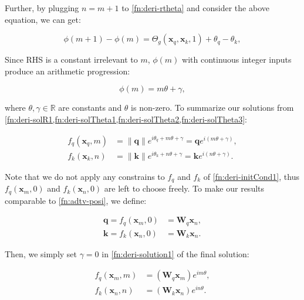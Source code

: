 Further, by plugging  $n = m + 1$ to \ref{fn:deri-rtheta} and consider the above equation, we can get:

\begin{equation}
	\phi(m + 1) - \phi(m) = \Theta_g({\boldsymbol x}_q, {\boldsymbol x}_k, 1) + \theta_q - \theta_k,
	\label{fn:deri-solTheta2}
\end{equation}

Since RHS is a constant irrelevant to $m$, $\phi(m)$ with continuous integer inputs produce an arithmetic progression:

\begin{equation}
	\phi(m) = m\theta + \gamma,
	\label{fn:deri-solTheta3}
\end{equation}

where $\theta,\gamma \in \mathbb{R}$ are constants and $\theta$ is non-zero. To summarize our solutions from \ref{fn:deri-solR1,fn:deri-solTheta1,fn:deri-solTheta2,fn:deri-solTheta3}:

\begin{equation}
	\begin{aligned}
		f_q({\boldsymbol x}_q, m) &= \|{\boldsymbol q}\|e^{i\theta_q + m\theta + \gamma} = {\boldsymbol q} e^{i(m\theta + \gamma)}, \\
		f_k({\boldsymbol x}_k, n) &= \|{\boldsymbol k}\|e^{i\theta_k + n\theta + \gamma}= {\boldsymbol k} e^{i(n\theta + \gamma)}.
	\end{aligned} 
	\label{fn:deri-solution1}
\end{equation}

Note that we do not apply any constrains to $f_q$ and $f_k$ of \ref{fn:deri-initCond1}, thus $f_q({\boldsymbol x}_m, 0)$ and $f_k({\boldsymbol x}_n, 0)$ are left to choose freely. To make our results comparable to \ref{fn:adtv-posi}, we define:

\begin{equation}
	\begin{aligned}
		{\boldsymbol q} = f_q({\boldsymbol x}_m, 0) &= {\boldsymbol W}_q{\boldsymbol x}_n,\\
		{\boldsymbol k} = f_k({\boldsymbol x}_n, 0) &= {\boldsymbol W}_k{\boldsymbol x}_n.
	\end{aligned}
\end{equation}

Then, we simply set $\gamma = 0$ in \ref{fn:deri-solution1} of the final solution:

\begin{equation}
	\begin{aligned}
		f_q({\boldsymbol x}_m, m) &= ({\boldsymbol W}_q{\boldsymbol x}_m)e^{im\theta},\\
		f_k({\boldsymbol x}_n, n) &= ({\boldsymbol W}_k{\boldsymbol x}_n)e^{in\theta}.
	\end{aligned}
\end{equation}


